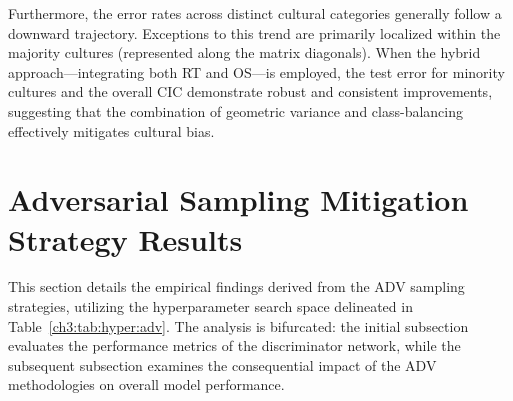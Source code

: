 Furthermore, the error rates across distinct cultural categories generally follow a downward trajectory. 
Exceptions to this trend are primarily localized within the majority cultures (represented along the matrix diagonals). 
When the hybrid approach—integrating both RT and OS—is employed, the test error for minority cultures and the overall CIC demonstrate robust and consistent improvements, suggesting that the combination of geometric variance and class-balancing effectively mitigates cultural bias.
%
\section{Adversarial Sampling Mitigation Strategy Results}
This section details the empirical findings derived from the ADV sampling strategies, utilizing the hyperparameter search space delineated in Table~\ref{ch3:tab:hyper:adv}. 
The analysis is bifurcated: the initial subsection evaluates the performance metrics of the discriminator network, while the subsequent subsection examines the consequential impact of the ADV methodologies on overall model performance.
